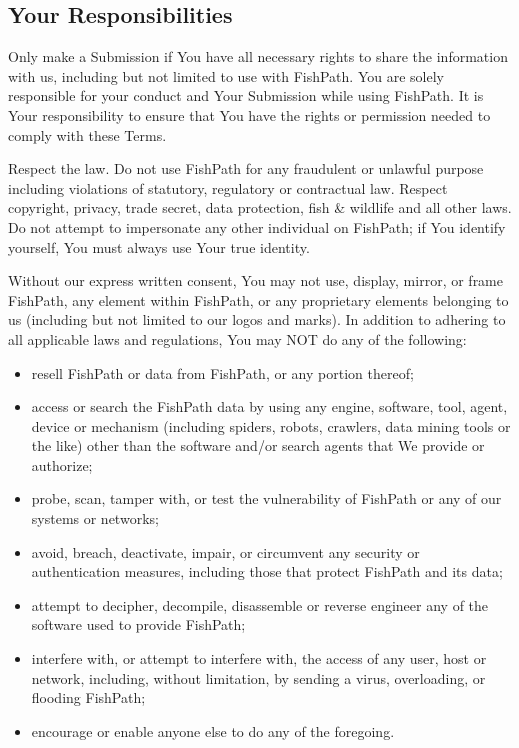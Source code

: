 \documentclass[11pt,]{book}
\providecommand{\tightlist}{%
  \setlength{\itemsep}{0pt}\setlength{\parskip}{0pt}}
\begin{document}
\hypertarget{your-responsibilities}{%
\subsection*{Your Responsibilities}\label{your-responsibilities}}

Only make a Submission if You have all necessary rights to share the
information with us, including but not limited to use with FishPath. You
are solely responsible for your conduct and Your Submission while using
FishPath. It is Your responsibility to ensure that You have the rights
or permission needed to comply with these Terms.

Respect the law. Do not use FishPath for any fraudulent or unlawful
purpose including violations of statutory, regulatory or contractual
law. Respect copyright, privacy, trade secret, data protection, fish \&
wildlife and all other laws. Do not attempt to impersonate any other
individual on FishPath; if You identify yourself, You must always use
Your true identity.

Without our express written consent, You may not use, display, mirror,
or frame FishPath, any element within FishPath, or any proprietary
elements belonging to us (including but not limited to our logos and
marks). In addition to adhering to all applicable laws and regulations,
You may NOT do any of the following:

\begin{itemize}
\tightlist
\item
  resell FishPath or data from FishPath, or any portion thereof;
\item
  access or search the FishPath data by using any engine, software,
  tool, agent, device or mechanism (including spiders, robots, crawlers,
  data mining tools or the like) other than the software and/or search
  agents that We provide or authorize;
\item
  probe, scan, tamper with, or test the vulnerability of FishPath or any
  of our systems or networks;
\item
  avoid, breach, deactivate, impair, or circumvent any security or
  authentication measures, including those that protect FishPath and its
  data;
\item
  attempt to decipher, decompile, disassemble or reverse engineer any of
  the software used to provide FishPath;
\item
  interfere with, or attempt to interfere with, the access of any user,
  host or network, including, without limitation, by sending a virus,
  overloading, or flooding FishPath;
\item
  encourage or enable anyone else to do any of the foregoing.
\end{itemize}
\end{document}
